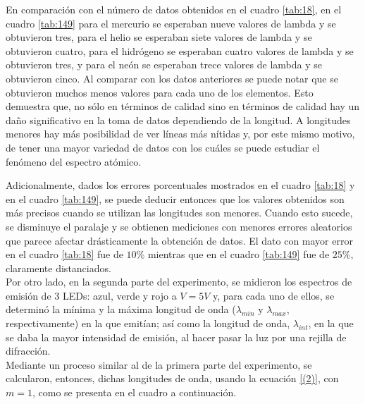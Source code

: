 \documentclass[%
 reprint,
 amsmath,amssymb,
 aps,
]{revtex4-1}
\begin{document}
En comparación con el número de datos obtenidos en el cuadro \ref{tab:18}, en el cuadro \ref{tab:149} para el mercurio se esperaban nueve valores de lambda y se obtuvieron tres, para el helio se esperaban siete valores de lambda y se obtuvieron cuatro, para el hidrógeno se esperaban cuatro valores de lambda y se obtuvieron tres, y para el neón se esperaban trece valores de lambda y se obtuvieron cinco. Al comparar con los datos anteriores se puede notar que se obtuvieron muchos menos valores para cada uno de los elementos. Esto demuestra que, no sólo en términos de calidad sino en términos de calidad hay un daño significativo en la toma de datos dependiendo de la longitud. A longitudes menores hay más posibilidad de ver líneas más nítidas y, por este mismo motivo, de tener una mayor variedad de datos con los cuáles se puede estudiar el fenómeno del espectro atómico. 

Adicionalmente, dados los errores porcentuales mostrados en el cuadro \ref{tab:18} y en el cuadro \ref{tab:149}, se puede deducir entonces que los valores obtenidos son más precisos cuando se utilizan las longitudes son menores. Cuando esto sucede, se disminuye el paralaje y se obtienen mediciones con menores errores aleatorios que parece afectar drásticamente la obtención de datos. El dato con mayor error en el cuadro \ref{tab:18} fue de $10\%$ mientras que en el cuadro \ref{tab:149} fue de $25\%$, claramente distanciados. \\

Por otro lado, en la segunda parte del experimento, se midieron los espectros de emisión de 3 LEDs: azul, verde y rojo a $V=5V$ y, para cada uno de ellos, se determinó la mínima y la máxima longitud de onda ($\lambda_{min}$ y $\lambda_{max}$, respectivamente) en la que emitían; así como la longitud de onda, $\lambda_{int}$, en la que se daba la mayor intensidad de emisión, al hacer pasar la luz por una rejilla de difracción. \\
Mediante un proceso similar al de la primera parte del experimento, se calcularon, entonces, dichas longitudes de onda, usando la ecuación \eqref{(2)}, con $m=1$, como se presenta en el cuadro a continuación.
\end{document}
